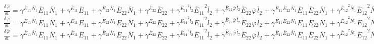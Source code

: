 $\frac{{\delta}^{} {\bar{\varphi}}_{}}{{\delta} {{{t}}_{}}^{}} = {\gamma}^{{{{\bar{E}}_{11}}^{}{{\bar{N}}_{1}}^{}}}{{{\bar{E}}_{11}}^{}{{\bar{N}}_{1}}^{}} + {\gamma}^{{{{\bar{E}}_{11}}^{}}}{{{\bar{E}}_{11}}^{}} + {\gamma}^{{{{\bar{E}}_{22}}^{}{{\bar{N}}_{1}}^{}}}{{{\bar{E}}_{22}}^{}{{\bar{N}}_{1}}^{}} + {\gamma}^{{{{\bar{E}}_{22}}^{}}}{{{\bar{E}}_{22}}^{}} + {\gamma}^{{{{\bar{E}}_{11}}^{2}{{\bar{l}}_{2}}^{}}}{{{\bar{E}}_{11}}^{2}{{\bar{l}}_{2}}^{}} + {\gamma}^{{{{\bar{E}}_{22}}^{}{{\bar{\varphi}}_{}}^{}{{\bar{l}}_{2}}^{}}}{{{\bar{E}}_{22}}^{}{{\bar{\varphi}}_{}}^{}{{\bar{l}}_{2}}^{}} + {\gamma}^{{{{\bar{E}}_{11}}^{}{{\bar{E}}_{22}}^{}{{\bar{N}}_{1}}^{}}}{{{\bar{E}}_{11}}^{}{{\bar{E}}_{22}}^{}{{\bar{N}}_{1}}^{}} + {\gamma}^{{{{\bar{E}}_{12}}^{2}{{\bar{N}}_{1}}^{}}}{{{\bar{E}}_{12}}^{2}{{\bar{N}}_{1}}^{}} + {\gamma}^{{{{\bar{E}}_{11}}^{2}{{\bar{N}}_{1}}^{}}}{{{\bar{E}}_{11}}^{2}{{\bar{N}}_{1}}^{}} + {\gamma}^{{{{\bar{E}}_{11}}^{2}}}{{{\bar{E}}_{11}}^{2}}$
$\frac{{\delta}^{} {\bar{\varphi}}_{}}{{\delta} {{{t}}_{}}^{}} = {\gamma}^{{{{\bar{E}}_{11}}^{}{{\bar{N}}_{1}}^{}}}{{{\bar{E}}_{11}}^{}{{\bar{N}}_{1}}^{}} + {\gamma}^{{{{\bar{E}}_{11}}^{}}}{{{\bar{E}}_{11}}^{}} + {\gamma}^{{{{\bar{E}}_{22}}^{}{{\bar{N}}_{1}}^{}}}{{{\bar{E}}_{22}}^{}{{\bar{N}}_{1}}^{}} + {\gamma}^{{{{\bar{E}}_{22}}^{}}}{{{\bar{E}}_{22}}^{}} + {\gamma}^{{{{\bar{E}}_{11}}^{2}{{\bar{l}}_{2}}^{}}}{{{\bar{E}}_{11}}^{2}{{\bar{l}}_{2}}^{}} + {\gamma}^{{{{\bar{E}}_{22}}^{}{{\bar{\varphi}}_{}}^{}{{\bar{l}}_{2}}^{}}}{{{\bar{E}}_{22}}^{}{{\bar{\varphi}}_{}}^{}{{\bar{l}}_{2}}^{}} + {\gamma}^{{{{\bar{E}}_{11}}^{}{{\bar{E}}_{22}}^{}{{\bar{N}}_{1}}^{}}}{{{\bar{E}}_{11}}^{}{{\bar{E}}_{22}}^{}{{\bar{N}}_{1}}^{}} + {\gamma}^{{{{\bar{E}}_{12}}^{2}{{\bar{N}}_{1}}^{}}}{{{\bar{E}}_{12}}^{2}{{\bar{N}}_{1}}^{}} + {\gamma}^{{{{\bar{E}}_{11}}^{2}{{\bar{N}}_{1}}^{}}}{{{\bar{E}}_{11}}^{2}{{\bar{N}}_{1}}^{}}$
$\frac{{\delta}^{} {\bar{\varphi}}_{}}{{\delta} {{{t}}_{}}^{}} = {\gamma}^{{{{\bar{E}}_{11}}^{}{{\bar{N}}_{1}}^{}}}{{{\bar{E}}_{11}}^{}{{\bar{N}}_{1}}^{}} + {\gamma}^{{{{\bar{E}}_{11}}^{}}}{{{\bar{E}}_{11}}^{}} + {\gamma}^{{{{\bar{E}}_{22}}^{}{{\bar{N}}_{1}}^{}}}{{{\bar{E}}_{22}}^{}{{\bar{N}}_{1}}^{}} + {\gamma}^{{{{\bar{E}}_{22}}^{}}}{{{\bar{E}}_{22}}^{}} + {\gamma}^{{{{\bar{E}}_{11}}^{2}{{\bar{l}}_{2}}^{}}}{{{\bar{E}}_{11}}^{2}{{\bar{l}}_{2}}^{}} + {\gamma}^{{{{\bar{E}}_{22}}^{}{{\bar{\varphi}}_{}}^{}{{\bar{l}}_{2}}^{}}}{{{\bar{E}}_{22}}^{}{{\bar{\varphi}}_{}}^{}{{\bar{l}}_{2}}^{}} + {\gamma}^{{{{\bar{E}}_{11}}^{}{{\bar{E}}_{22}}^{}{{\bar{N}}_{1}}^{}}}{{{\bar{E}}_{11}}^{}{{\bar{E}}_{22}}^{}{{\bar{N}}_{1}}^{}} + {\gamma}^{{{{\bar{E}}_{12}}^{2}{{\bar{N}}_{1}}^{}}}{{{\bar{E}}_{12}}^{2}{{\bar{N}}_{1}}^{}}$
